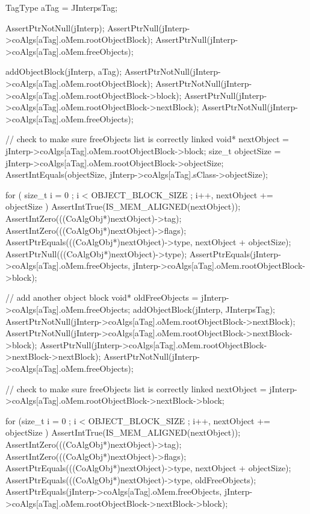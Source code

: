   TagType aTag = JInterpsTag;
    
  AssertPtrNotNull(jInterp);
  AssertPtrNull(jInterp->coAlgs[aTag].oMem.rootObjectBlock);
  AssertPtrNull(jInterp->coAlgs[aTag].oMem.freeObjects);

  addObjectBlock(jInterp, aTag);
  AssertPtrNotNull(jInterp->coAlgs[aTag].oMem.rootObjectBlock);
  AssertPtrNotNull(jInterp->coAlgs[aTag].oMem.rootObjectBlock->block);
  AssertPtrNull(jInterp->coAlgs[aTag].oMem.rootObjectBlock->nextBlock);
  AssertPtrNotNull(jInterp->coAlgs[aTag].oMem.freeObjects);

  // check to make sure freeObjects list is correctly linked
  void* nextObject  = jInterp->coAlgs[aTag].oMem.rootObjectBlock->block;
  size_t objectSize = jInterp->coAlgs[aTag].oMem.rootObjectBlock->objectSize;
  AssertIntEquals(objectSize, jInterp->coAlgs[aTag].sClass->objectSize);
  
  for ( size_t i = 0 ; i < OBJECT_BLOCK_SIZE ; i++, nextObject += objectSize ) {
    AssertIntTrue(IS_MEM_ALIGNED(nextObject));
    AssertIntZero(((CoAlgObj*)nextObject)->tag);
    AssertIntZero(((CoAlgObj*)nextObject)->flags);
    AssertPtrEquals(((CoAlgObj*)nextObject)->type, nextObject + objectSize);
  }
  AssertPtrNull(((CoAlgObj*)nextObject)->type);
  AssertPtrEquals(jInterp->coAlgs[aTag].oMem.freeObjects,
    jInterp->coAlgs[aTag].oMem.rootObjectBlock->block);

  // add another object block
  void* oldFreeObjects = jInterp->coAlgs[aTag].oMem.freeObjects;
  addObjectBlock(jInterp, JInterpsTag);
  AssertPtrNotNull(jInterp->coAlgs[aTag].oMem.rootObjectBlock->nextBlock);
  AssertPtrNotNull(jInterp->coAlgs[aTag].oMem.rootObjectBlock->nextBlock->block);
  AssertPtrNull(jInterp->coAlgs[aTag].oMem.rootObjectBlock->nextBlock->nextBlock);
  AssertPtrNotNull(jInterp->coAlgs[aTag].oMem.freeObjects);

  // check to make sure freeObjects list is correctly linked
  nextObject = jInterp->coAlgs[aTag].oMem.rootObjectBlock->nextBlock->block;

  for (size_t i = 0 ; i < OBJECT_BLOCK_SIZE ; i++, nextObject += objectSize ) {
    AssertIntTrue(IS_MEM_ALIGNED(nextObject));
    AssertIntZero(((CoAlgObj*)nextObject)->tag);
    AssertIntZero(((CoAlgObj*)nextObject)->flags);
    AssertPtrEquals(((CoAlgObj*)nextObject)->type, nextObject + objectSize);
  }
  AssertPtrEquals(((CoAlgObj*)nextObject)->type, oldFreeObjects);
  AssertPtrEquals(jInterp->coAlgs[aTag].oMem.freeObjects,
    jInterp->coAlgs[aTag].oMem.rootObjectBlock->nextBlock->block);
\stopCTest
\stopTestCase
\stopTestSuite

